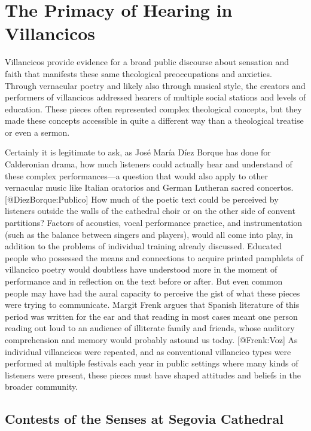 

\section{The Primacy of Hearing in Villancicos}


Villancicos provide evidence for a broad public discourse about sensation and
faith that manifests these same theological preoccupations and anxieties.
Through vernacular poetry and likely also through musical style, the creators
and performers of villancicos addressed hearers of multiple social stations and
levels of education.
These pieces often represented complex theological concepts, but they made these
concepts accessible in quite a different way than a theological treatise or even
a sermon. 

Certainly it is legitimate to ask, as José María Díez Borque has done for
Calderonian drama, how much listeners could actually hear and understand of
these complex performances---a question that would also apply to other 
vernacular music like Italian oratorios and German Lutheran sacred concertos.
[@DiezBorque:Publico]
How much of the poetic text could be perceived by listeners outside the walls of
the cathedral choir or on the other side of convent partitions?
Factors of acoustics, vocal performance practice, and instrumentation (such as
the balance between singers and players), would all come into play, in addition
to the problems of individual training already discussed.
Educated people who possessed the means and connections to acquire printed
pamphlets of villancico poetry would doubtless have understood more in the
moment of performance and in reflection on the text before or after.
But even common people may have had the aural capacity to perceive the gist of
what these pieces were trying to communicate.
Margit Frenk argues that Spanish literature of this period was written for the
ear and that reading in most cases meant one person reading out loud to an
audience of illiterate family and friends, whose auditory comprehension and
memory would probably astound us today.
[@Frenk:Voz] 
As individual villancicos were repeated, and as conventional villancico types
were performed at multiple festivals each year in public settings where many
kinds of listeners were present, these pieces must have shaped attitudes and
beliefs in the broader community. 


\subsection{Contests of the Senses at Segovia Cathedral}

